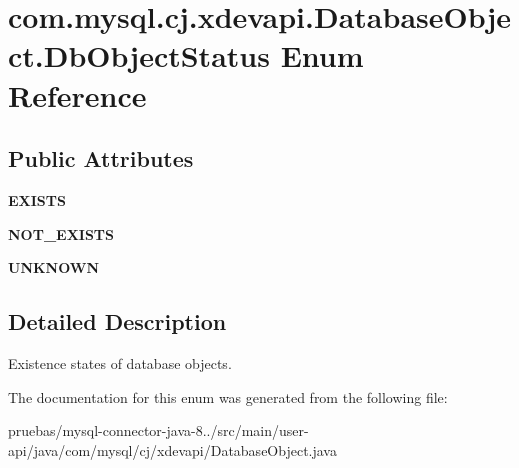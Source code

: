 \hypertarget{enumcom_1_1mysql_1_1cj_1_1xdevapi_1_1_database_object_1_1_db_object_status}{}\section{com.\+mysql.\+cj.\+xdevapi.\+Database\+Object.\+Db\+Object\+Status Enum Reference}
\label{enumcom_1_1mysql_1_1cj_1_1xdevapi_1_1_database_object_1_1_db_object_status}
\subsection*{Public Attributes}
\begin{DoxyCompactItemize}
\item 
\mbox{\label{enumcom_1_1mysql_1_1cj_1_1xdevapi_1_1_database_object_1_1_db_object_status_ab311f9439f2cc5a20a787d4a3345e689}} 
{\bfseries E\+X\+I\+S\+TS}
\item 
\mbox{\label{enumcom_1_1mysql_1_1cj_1_1xdevapi_1_1_database_object_1_1_db_object_status_a9f8e319c4f1c12abb733d11495de154a}} 
{\bfseries N\+O\+T\+\_\+\+E\+X\+I\+S\+TS}
\item 
\mbox{\label{enumcom_1_1mysql_1_1cj_1_1xdevapi_1_1_database_object_1_1_db_object_status_afa43291eef691fd6e3b4ed8e819cd348}} 
{\bfseries U\+N\+K\+N\+O\+WN}
\end{DoxyCompactItemize}


\subsection{Detailed Description}
Existence states of database objects. 

The documentation for this enum was generated from the following file\+:\begin{DoxyCompactItemize}
\item 
pruebas/mysql-\/connector-\/java-\/8../src/main/user-\/api/java/com/mysql/cj/xdevapi/Database\+Object.\+java\end{DoxyCompactItemize}
